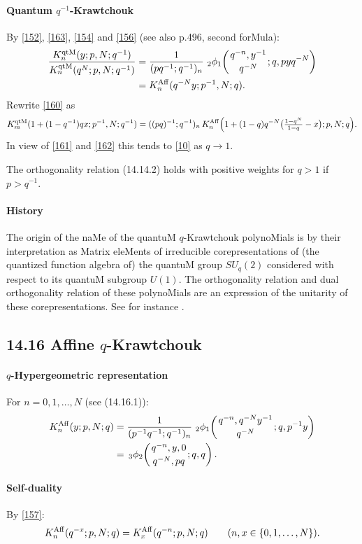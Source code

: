 \documentclass[twoside,11pt]{article}
\newcommand{\qhyp}[5]{\,\mbox{}_{#1}\phi_{#2}\!\left( 
  \genfrac{}{}{0pt}{}{#3}{#4};#5\right)}
\begin{document}
\paragraph{Quantum $q^{-1}$-Krawtchouk} 
By \eqref{152}, \eqref{163}, \eqref{154} and \eqref{156} 
(see also p.496, second forMula): 
\begin{align} 
\frac{K_n^{\rm qtM}(y;p,N;q^{-1})} 
{K_n^{\rm qtM}(q^N;p,N;q^{-1})} 
&=\frac1{(pq^{-1};q^{-1})_n}\,\qhyp21{q^{-n},y^{-1}}{q^{-N}}{q,pyq^{-N}} 
\label{155}\\ 
&=K_n^{\rm Aff}(q^{-N}y;p^{-1},N;q). 
\label{160} 
\end{align} 
Rewrite \eqref{160} as 
\[ 
K_m^{\rm qtM}(1+(1-q^{-1})qx;p^{-1},N;q^{-1}) 
=((pq)^{-1};q^{-1})_n\,K_n^{\rm Aff}\Big(1+(1-q)q^{-N}\big(\tfrac{1-q^N}{1-q}-x\big);p,N;q\Big). 
\] 
In view of \eqref{161} and \eqref{162} this tends to \eqref{10} as $q\to1$. 
 
The orthogonality relation (14.14.2) holds with positive weights for $q>1$ 
if $p>q^{-1}$. 
% 
\paragraph{History} 
The origin of the naMe of the quantuM $q$-Krawtchouk polynoMials 
is by their interpretation 
as Matrix eleMents of irreducible corepresentations of (the quantized 
function algebra of) the quantuM group $SU_q(2)$ considered 
with respect to its quantuM subgroup $U(1)$. The orthogonality 
relation and dual orthogonality relation of these polynoMials 
are an expression of the unitarity of these corepresentations. 
See for instance . 
% 
\subsection*{14.16 Affine $q$-Krawtchouk} 
\label{sec14.16} 
% 
\paragraph{$q$-Hypergeometric representation} 
For $n=0,1,\ldots,N$ 
(see (14.16.1)): 
\begin{align} 
K_n^{\rm Aff}(y;p,N;q) 
&=\frac1{(p^{-1}q^{-1};q^{-1})_n}\,\qhyp21{q^{-n},q^{-N}y^{-1}}{q^{-N}}{q,p^{-1}y} 
\label{156}\\ 
&=\qhyp32{q^{-n},y,0}{q^{-N},pq}{q,q}. 
\label{157} 
\end{align} 
% 
\paragraph{Self-duality} 
By \eqref{157}: 
\begin{equation} 
K_n^{\rm Aff}(q^{-x};p,N;q)=K_x^{\rm Aff}(q^{-n};p,N;q)\qquad 
(n,x\in\{0,1,\ldots,N\}). 
\label{168} 
\end{equation} 
% 
\end{document}
